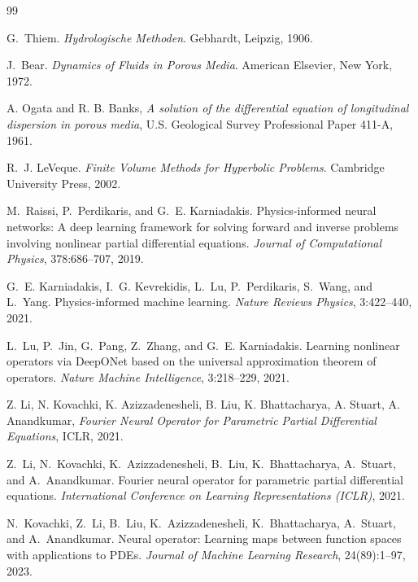 \documentclass[11pt]{article}
\begin{document}
\begin{thebibliography}{99}

G.~Thiem.
\textit{Hydrologische Methoden}.
Gebhardt, Leipzig, 1906.

J.~Bear.
\textit{Dynamics of Fluids in Porous Media}.
American Elsevier, New York, 1972.

A. Ogata and R. B. Banks,
\textit{A solution of the differential equation of longitudinal dispersion in
porous media}, U.S. Geological Survey Professional Paper 411-A, 1961.

R.~J. LeVeque.
\textit{Finite Volume Methods for Hyperbolic Problems}.
Cambridge University Press, 2002.

M.~Raissi, P.~Perdikaris, and G.~E. Karniadakis.
Physics-informed neural networks: A deep learning framework for solving forward
and inverse problems involving nonlinear partial differential equations.
\textit{Journal of Computational Physics}, 378:686--707, 2019.

G.~E. Karniadakis, I.~G. Kevrekidis, L.~Lu, P.~Perdikaris, S.~Wang, and L.~Yang.
Physics-informed machine learning.
\textit{Nature Reviews Physics}, 3:422--440, 2021.

L.~Lu, P.~Jin, G.~Pang, Z.~Zhang, and G.~E. Karniadakis.
Learning nonlinear operators via DeepONet based on the universal approximation
theorem of operators.
\textit{Nature Machine Intelligence}, 3:218--229, 2021.

Z. Li, N. Kovachki, K. Azizzadenesheli, B. Liu, K. Bhattacharya, A. Stuart,
A. Anandkumar, \textit{Fourier Neural Operator for Parametric Partial
Differential Equations}, ICLR, 2021.

Z.~Li, N.~Kovachki, K.~Azizzadenesheli, B.~Liu, K.~Bhattacharya, A.~Stuart,
and A.~Anandkumar.
Fourier neural operator for parametric partial differential equations.
\textit{International Conference on Learning Representations (ICLR)}, 2021.

N.~Kovachki, Z.~Li, B.~Liu, K.~Azizzadenesheli, K.~Bhattacharya, A.~Stuart,
and A.~Anandkumar.
Neural operator: Learning maps between function spaces with applications to
PDEs.
\textit{Journal of Machine Learning Research}, 24(89):1--97, 2023.


\end{thebibliography}
\end{document}
